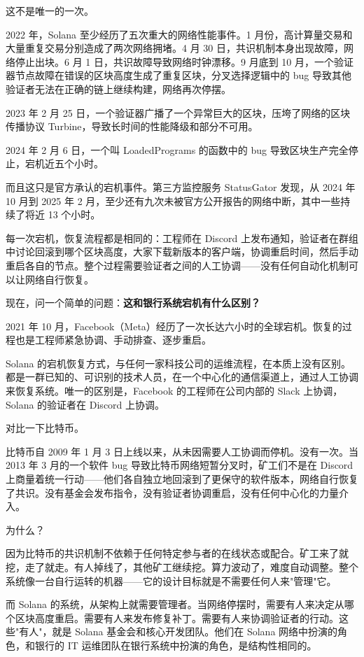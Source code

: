 \documentclass[a4paper,12pt,openany]{ctexbook}
\begin{document}
这不是唯一的一次。

2022 年，Solana 至少经历了五次重大的网络性能事件。1 月份，高计算量交易和大量重复交易分别造成了两次网络拥堵。4 月 30 日，共识机制本身出现故障，网络停止出块。6 月 1 日，共识故障导致网络时钟漂移。9 月底到 10 月，一个验证器节点故障在错误的区块高度生成了重复区块，分叉选择逻辑中的 bug 导致其他验证者无法在正确的链上继续构建，网络再次停摆。

2023 年 2 月 25 日，一个验证器广播了一个异常巨大的区块，压垮了网络的区块传播协议 Turbine，导致长时间的性能降级和部分不可用。

2024 年 2 月 6 日，一个叫 LoadedPrograms 的函数中的 bug 导致区块生产完全停止，宕机近五个小时。

而且这只是官方承认的宕机事件。第三方监控服务 StatusGator 发现，从 2024 年 10 月到 2025 年 2 月，至少还有九次未被官方公开报告的网络中断，其中一些持续了将近 13 个小时。

每一次宕机，恢复流程都是相同的：工程师在 Discord 上发布通知，验证者在群组中讨论回滚到哪个区块高度，大家下载新版本的客户端，协调重启时间，然后手动重启各自的节点。整个过程需要验证者之间的人工协调——没有任何自动化机制可以让网络自行恢复。

现在，问一个简单的问题：\textbf{这和银行系统宕机有什么区别？}

2021 年 10 月，Facebook（Meta）经历了一次长达六小时的全球宕机。恢复的过程也是工程师紧急协调、手动排查、逐步重启。

Solana 的宕机恢复方式，与任何一家科技公司的运维流程，在本质上没有区别。都是一群已知的、可识别的技术人员，在一个中心化的通信渠道上，通过人工协调来恢复系统。唯一的区别是，Facebook 的工程师在公司内部的 Slack 上协调，Solana 的验证者在 Discord 上协调。

对比一下比特币。

比特币自 2009 年 1 月 3 日上线以来，从未因需要人工协调而停机。没有一次。当 2013 年 3 月的一个软件 bug 导致比特币网络短暂分叉时，矿工们不是在 Discord 上商量着统一行动——他们各自独立地回滚到了更保守的软件版本，网络自行恢复了共识。没有基金会发布指令，没有验证者协调重启，没有任何中心化的力量介入。

为什么？

因为比特币的共识机制不依赖于任何特定参与者的在线状态或配合。矿工来了就挖，走了就走。有人掉线了，其他矿工继续挖。算力波动了，难度自动调整。整个系统像一台自行运转的机器——它的设计目标就是不需要任何人来"管理"它。

而 Solana 的系统，从架构上就需要管理者。当网络停摆时，需要有人来决定从哪个区块高度重启。需要有人来发布修复补丁。需要有人来协调验证者的行动。这些"有人"，就是 Solana 基金会和核心开发团队。他们在 Solana 网络中扮演的角色，和银行的 IT 运维团队在银行系统中扮演的角色，是结构性相同的。
\end{document}
